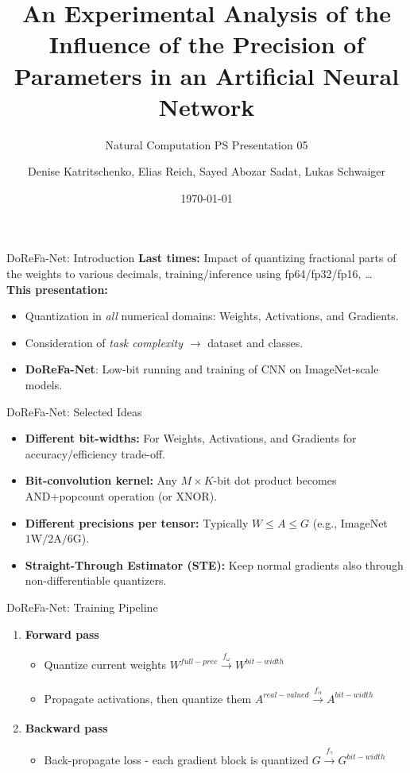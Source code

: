 \documentclass[aspectratio=169]{beamer} %
\title{An Experimental Analysis of the Influence of the Precision of Parameters in an Artificial Neural Network}
\subtitle{Natural Computation PS Presentation 05}
\author[D. K., E. R., S. A. S., L. S.]{Denise Katritschenko, Elias Reich, Sayed Abozar Sadat, Lukas Schwaiger}
\institute[\plusshort]{\pluslong\\ Department of Artificial Intelligence and Human Interfaces (AIHI)}
\date[\today]{\today}
\begin{document}
\frame{\titlepage}

\begin{frame}{DoReFa-Net: Introduction}
  \textbf{Last times:} Impact of quantizing fractional parts of the weights to various decimals, training/inference using fp64/fp32/fp16, \dots\\
  \vspace{0.5cm}
  \textbf{This presentation:}
  \begin{itemize}
    \item Quantization in \textit{all} numerical domains: Weights, Activations, and
          Gradients.
    \item Consideration of \textit{task complexity} $\rightarrow$ dataset and classes.
    \item \textbf{DoReFa-Net}\cite{zhou2016dorefa}: Low-bit running and training of CNN on ImageNet-scale models.
  \end{itemize}
\end{frame}

\begin{frame}{DoReFa-Net: Selected Ideas}
  \begin{itemize}
    \item \textbf{Different bit-widths:} For Weights, Activations, and Gradients for accuracy/efficiency trade-off.
    \item \textbf{Bit-convolution kernel:} Any $M\times K$-bit dot product becomes AND+popcount operation (or XNOR).
    \item \textbf{Different precisions per tensor:} Typically $W\le A \le G$ (e.g., ImageNet $1\text{W}/2\text{A}/6\text{G}$).
    \item \textbf{Straight-Through Estimator (STE):} Keep normal gradients also through non-differentiable quantizers.
  \end{itemize}
\end{frame}

\begin{frame}{DoReFa-Net: Training Pipeline}
  \begin{enumerate}
    \item \textbf{Forward pass}
          \begin{itemize}
            \item Quantize current weights $W^{full-prec}\xrightarrow[]{f_\omega}W^{bit-width}$
            \item Propagate activations, then quantize them
                  $A^{real-valued}\xrightarrow[]{f_\alpha}A^{bit-width}$
          \end{itemize}
    \item \textbf{Backward pass}
          \begin{itemize}
            \item Back-propagate loss - each gradient block is quantized
                  $G\xrightarrow[]{f_\gamma}G^{bit-width}$
          \end{itemize}
  \end{enumerate}
\end{frame}
\end{document}
